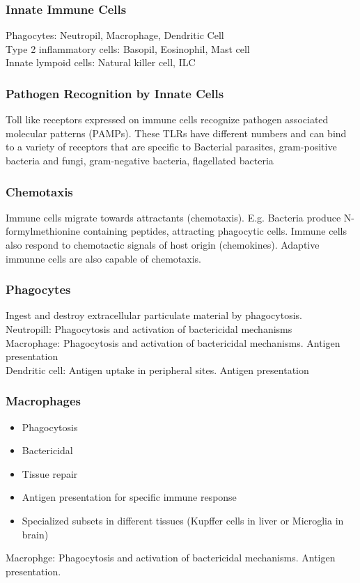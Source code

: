 \begin{itemize}
\begin{itemize}
\subsubsection{Innate Immune Cells}
Phagocytes: Neutropil, Macrophage, Dendritic Cell
\\Type 2 inflammatory cells: Basopil, Eosinophil, Mast cell
\\Innate lympoid cells: Natural killer cell, ILC
\subsubsection{Pathogen Recognition by Innate Cells}
Toll like receptors expressed on immune cells recognize pathogen associated molecular patterns (PAMPs). These TLRs have different numbers and can bind to a variety of receptors that are specific to Bacterial parasites, gram-positive bacteria and fungi, gram-negative bacteria, flagellated bacteria

\subsubsection{Chemotaxis}
Immune cells migrate towards
attractants (chemotaxis). E.g.
Bacteria produce N-formylmethionine
containing
peptides, attracting
phagocytic cells. Immune
cells also respond to
chemotactic signals of host
origin (chemokines). Adaptive immunne cells are also capable of chemotaxis.
\subsubsection{Phagocytes}
Ingest and destroy extracellular particulate material by phagocytosis.
\\Neutropill: Phagocytosis and activation of bactericidal mechanisms
\\Macrophage: Phagocytosis and activation of bactericidal mechanisms. Antigen presentation
\\Dendritic cell: Antigen uptake in peripheral sites. Antigen presentation

\subsubsection{Macrophages}
\begin{itemize}
    \item Phagocytosis
    \item Bactericidal
    \item Tissue repair
    \item Antigen presentation for specific immune response
    \item Specialized subsets in different tissues (Kupffer cells in liver or Microglia in brain)
\end{itemize}
Macrophge: Phagocytosis and activation of bactericidal mechanisms. Antigen presentation.

\end{itemize}
\end{itemize}

